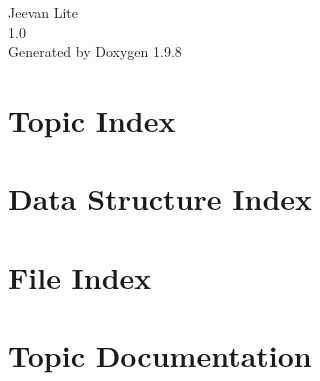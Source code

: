 \documentclass[twoside]{book}
\newcommand{\+}{\discretionary{\mbox{\scriptsize$\hookleftarrow$}}{}{}}
\newcommand{\clearemptydoublepage}{%
    \newpage{\pagestyle{empty}\cleardoublepage}%
  }
\begin{document}
  \raggedbottom
    \hypersetup{pageanchor=false,
                bookmarksnumbered=true,
                pdfencoding=unicode
               }
  \begin{titlepage}
  \vspace*{7cm}
  \begin{center}%
  {\Large Jeevan Lite}\\
  [1ex]\large 1.\+0 \\
  \vspace*{1cm}
  {\large Generated by Doxygen 1.9.8}\\
  \end{center}
  \end{titlepage}
  \clearemptydoublepage
  \tableofcontents
  \clearemptydoublepage
  \hypersetup{pageanchor=true}

\chapter{Topic Index}

\chapter{Data Structure Index}

\chapter{File Index}

\chapter{Topic Documentation}

\end{document}
